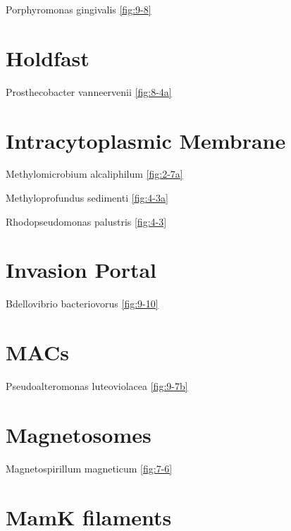 \documentclass[]{tufte-book}
\begin{document}
Porphyromonas gingivalis \ref{fig:9-8}

\hypertarget{holdfast}{%
\section*{Holdfast}\label{holdfast}}

Prosthecobacter vanneervenii \ref{fig:8-4a}

\hypertarget{intracytoplasmic-membrane}{%
\section*{Intracytoplasmic Membrane}\label{intracytoplasmic-membrane}}

Methylomicrobium alcaliphilum \ref{fig:2-7a}

Methyloprofundus sedimenti \ref{fig:4-3a}

Rhodopseudomonas palustris \ref{fig:4-3}

\hypertarget{invasion-portal}{%
\section*{Invasion Portal}\label{invasion-portal}}

Bdellovibrio bacteriovorus \ref{fig:9-10}

\hypertarget{macs}{%
\section*{MACs}\label{macs}}

Pseudoalteromonas luteoviolacea \ref{fig:9-7b}

\hypertarget{magnetosomes}{%
\section*{Magnetosomes}\label{magnetosomes}}

Magnetospirillum magneticum \ref{fig:7-6}

\hypertarget{mamk-filaments}{%
\section*{MamK filaments}\label{mamk-filaments}}
\end{document}
